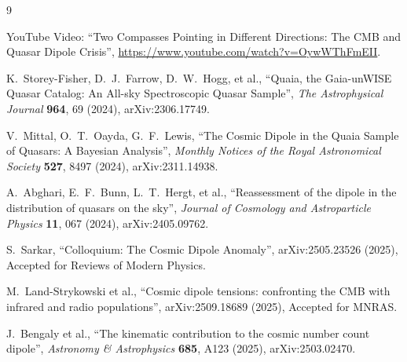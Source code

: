 	\begin{thebibliography}{9}
		
		YouTube Video: ``Two Compasses Pointing in Different Directions: The CMB and Quasar Dipole Crisis'',
		\url{https://www.youtube.com/watch?v=OywWThFmEII}.
		
		K.~Storey-Fisher, D.~J.~Farrow, D.~W.~Hogg, et al.,
		``Quaia, the Gaia-unWISE Quasar Catalog: An All-sky Spectroscopic Quasar Sample'',
		\emph{The Astrophysical Journal} \textbf{964}, 69 (2024),
		arXiv:2306.17749.
		
		V.~Mittal, O.~T.~Oayda, G.~F.~Lewis,
		``The Cosmic Dipole in the Quaia Sample of Quasars: A Bayesian Analysis'',
		\emph{Monthly Notices of the Royal Astronomical Society} \textbf{527}, 8497 (2024),
		arXiv:2311.14938.
		
		A.~Abghari, E.~F.~Bunn, L.~T.~Hergt, et al.,
		``Reassessment of the dipole in the distribution of quasars on the sky'',
		\emph{Journal of Cosmology and Astroparticle Physics} \textbf{11}, 067 (2024),
		arXiv:2405.09762.
		
		S.~Sarkar,
		``Colloquium: The Cosmic Dipole Anomaly'',
		arXiv:2505.23526 (2025),
		Accepted for Reviews of Modern Physics.
		
		M.~Land-Strykowski et al.,
		``Cosmic dipole tensions: confronting the CMB with infrared and radio populations'',
		arXiv:2509.18689 (2025),
		Accepted for MNRAS.
		
		J.~Bengaly et al.,
		``The kinematic contribution to the cosmic number count dipole'',
		\emph{Astronomy \& Astrophysics} \textbf{685}, A123 (2025),
		arXiv:2503.02470.
		
	\end{thebibliography}
